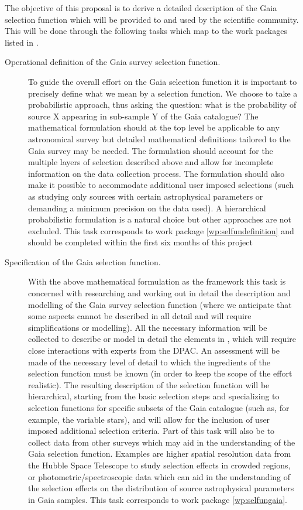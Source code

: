 The objective of this proposal is to derive a detailed description of the Gaia selection function which will be provided to and used by the scientific community. This will be done through the following tasks which map to the work packages listed in .

\begin{description}
    \item[Operational definition of the Gaia survey selection function.] To guide the overall effort on the Gaia selection function it is important to precisely define what we mean by a selection function. We choose to take a probabilistic approach, thus asking the question: what is the probability of source X appearing in sub-sample Y of the Gaia catalogue? The mathematical formulation should at the top level be applicable to any astronomical survey but detailed mathematical definitions tailored to the Gaia survey may be needed. The formulation should account for the multiple layers of selection described above and allow for incomplete information on the data collection process. The formulation should also make it possible to accommodate additional user imposed selections (such as studying only sources with certain astrophysical parameters or demanding a minimum precision on the data used). A hierarchical probabilistic formulation is a natural choice but other approaches are not excluded. This task corresponds to work package \ref{wp:selfundefinition} and should be completed within the first six months of this project
    \item[Specification of the Gaia selection function.] With the above mathematical formulation as the framework this task is concerned with researching and working out in detail the description and modelling of the Gaia survey selection function (where we anticipate that some aspects cannot be described in all detail and will require simplifications or modelling). All the necessary information will be collected to describe or model in detail the elements in , which will require close interactions with experts from the DPAC. An assessment will be made of the necessary level of detail to which the ingredients of the selection function must be known (in order to keep the scope of the effort realistic). The resulting description of the selection function will be hierarchical, starting from the basic selection steps and specializing to selection functions for specific subsets of the Gaia catalogue (such as, for example, the variable stars), and will allow for the inclusion of user imposed additional selection criteria. Part of this task will also be to collect data from other surveys which may aid in the understanding of the Gaia selection function. Examples are higher spatial resolution data from the Hubble Space Telescope to study selection effects in crowded regions, or photometric/spectroscopic data which can aid in the understanding of the selection effects on the distribution of source astrophysical parameters in Gaia samples. This task corresponds to work package \ref{wp:selfungaia}.

\end{description}
